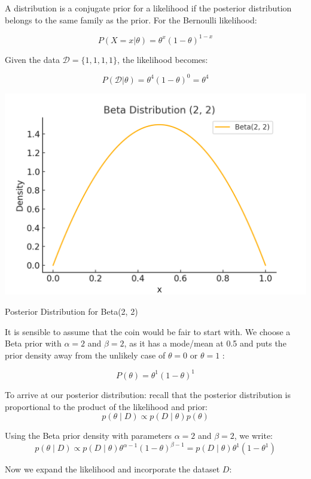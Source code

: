 A distribution is a conjugate prior for a likelihood if the posterior distribution belongs to the same family as the prior. For the Bernoulli likelihood:

\[
    P(X=x|\theta) = \theta^x (1 - \theta)^{1 - x}
\]

Given the data \( \mathcal{D} = \{1, 1, 1, 1\} \), the likelihood becomes:

\[
    P(\mathcal{D}|\theta) = \theta^4 (1 - \theta)^0 = \theta^4
\]

\begin{marginfigure}
    \centering
    \includegraphics[width=\linewidth]{img/11_Beta_2_2.png}
    \caption{Posterior Distribution for Beta(2, 2)}
    \label{fig:beta_prior}
\end{marginfigure}


It is sensible to assume that the coin would be fair to start with. We choose a Beta prior with \( \alpha = 2 \) and \( \beta = 2 \), as it has a mode/mean at 0.5 and puts the prior density away from the unlikely case of \( \theta = 0 \) or \( \theta = 1 \) :

\[
    P(\theta) = \theta^{1} (1 - \theta)^{1}
\]

To arrive at our posterior distribution: recall that the posterior distribution is proportional to the product of the likelihood and prior:
\[
    p(\theta \mid D) \propto p(D \mid \theta)p(\theta)
\]


Using the Beta prior density with parameters \(\alpha = 2\) and \(\beta = 2\), we write:
\[
    p(\theta \mid D) \propto p(D \mid \theta) \theta^{\alpha-1} (1 - \theta)^{\beta-1} = p(D \mid \theta) \theta^1 (1 - \theta^1)
\]


Now we expand the likelihood and incorporate the dataset \(D\): 





